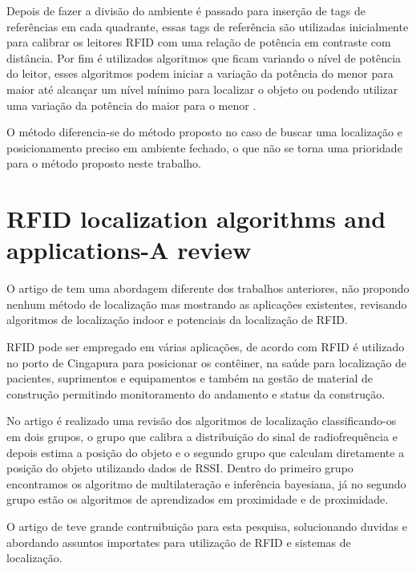 \par
Depois de fazer a divisão do ambiente é passado para inserção de tags de referências em cada quadrante, essas tags de referência são utilizadas inicialmente para calibrar os leitores RFID com uma relação de potência em contraste com distância. Por fim é utilizados algoritmos que ficam variando o nível de potência do leitor, esses algoritmos podem iniciar a variação da potência do menor para maior até alcançar um nível mínimo para localizar o objeto ou podendo utilizar uma variação da potência do maior para o menor \citeauthor{localization2010}.

\par
O método \citeauthor{localization2010} diferencia-se do método proposto no caso de buscar uma localização e posicionamento preciso em ambiente fechado, o que não se torna uma prioridade para o método proposto neste trabalho.


\section{RFID localization algorithms and applications-A review}
O artigo de \citeauthor{rfid2009review} tem uma abordagem diferente dos trabalhos anteriores, não propondo nenhum método de localização mas mostrando as aplicações existentes, revisando algoritmos de localização indoor e potenciais da localização de RFID.
\par
RFID pode ser empregado em várias aplicações, de acordo com \citeauthor{rfid2009review} RFID é utilizado no porto de Cingapura para posicionar os contêiner, na saúde para localização de pacientes, suprimentos e equipamentos  e também na gestão de material de construção permitindo monitoramento do andamento e status da construção.
\par
No artigo é realizado uma revisão dos algoritmos de localização classificando-os em dois grupos, o grupo que calibra a distribuição do sinal de radiofrequência e depois estima a posição do objeto e o segundo grupo que calculam diretamente a posição do objeto utilizando dados de RSSI. Dentro do primeiro grupo encontramos os algoritmo de multilateração e inferência bayesiana, já no segundo grupo estão os algoritmos de aprendizados em proximidade e de proximidade.
\par
O artigo de \citeauthor{rfid2009review} teve grande contruibuição para esta pesquisa, solucionando duvidas e abordando assuntos importates para utilização de RFID e sistemas de localização.
